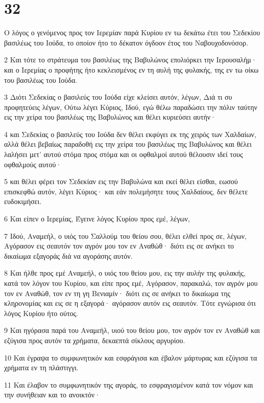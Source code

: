 \chapter{32}

\par Ο λόγος ο γενόμενος προς τον Ιερεμίαν παρά Κυρίου εν τω δεκάτω έτει του Σεδεκίου βασιλέως του Ιούδα, το οποίον ήτο το δέκατον όγδοον έτος του Ναβουχοδονόσορ.
\par 2 Και τότε το στράτευμα του βασιλέως της Βαβυλώνος επολιόρκει την Ιερουσαλήμ· και ο Ιερεμίας ο προφήτης ήτο κεκλεισμένος εν τη αυλή της φυλακής, της εν τω οίκω του βασιλέως του Ιούδα.
\par 3 Διότι Σεδεκίας ο βασιλεύς του Ιούδα είχε κλείσει αυτόν, λέγων, Διά τι συ προφητεύεις λέγων, Ούτω λέγει Κύριος, Ιδού, εγώ θέλω παραδώσει την πόλιν ταύτην εις την χείρα του βασιλέως της Βαβυλώνος και θέλει κυριεύσει αυτήν·
\par 4 και Σεδεκίας ο βασιλεύς του Ιούδα δεν θέλει εκφύγει εκ της χειρός των Χαλδαίων, αλλά θέλει βεβαίως παραδοθή εις την χείρα του βασιλέως της Βαβυλώνος και θέλει λαλήσει μετ' αυτού στόμα προς στόμα και οι οφθαλμοί αυτού θέλουσιν ιδεί τους οφθαλμούς αυτού·
\par 5 και θέλει φέρει τον Σεδεκίαν εις την Βαβυλώνα και εκεί θέλει είσθαι, εωσού επισκεφθώ αυτόν, λέγει Κύριος· και εάν πολεμήσητε τους Χαλδαίους, δεν θέλετε ευδοκιμήσει.
\par 6 Και είπεν ο Ιερεμίας, Έγεινε λόγος Κυρίου προς εμέ, λέγων,
\par 7 Ιδού, Αναμεήλ, ο υιός του Σαλλούμ του θείου σου, θέλει ελθεί προς σε, λέγων, Αγόρασον εις σεαυτόν τον αγρόν μου τον εν Αναθώθ· διότι εις σε ανήκει το δικαίωμα εξαγοράς διά να αγοράσης αυτόν.
\par 8 Και ήλθε προς εμέ Αναμεήλ, ο υιός του θείου μου, εις την αυλήν της φυλακής, κατά τον λόγον του Κυρίου, και είπε προς εμέ, Αγόρασον, παρακαλώ, τον αγρόν μου τον εν Αναθώθ, τον εν τη γη Βενιαμίν· διότι εις σε ανήκει το δικαίωμα της κληρονομίας και εις σε η εξαγορά· αγόρασον αυτόν εις σεαυτόν. Τότε εγνώρισα ότι λόγος Κυρίου ήτο ούτος.
\par 9 Και ηγόρασα παρά του Αναμεήλ, υιού του θείου μου, τον αγρόν τον εν Αναθώθ και εζύγισα προς αυτόν τα χρήματα, δεκαεπτά σίκλους αργυρίου.
\par 10 Και έγραψα το συμφωνητικόν και εσφράγισα και έβαλον μάρτυρας και εζύγισα τα χρήματα εν τη πλάστιγγι.
\par 11 Και έλαβον το συμφωνητικόν της αγοράς, το εσφραγισμένον κατά τον νόμον και την συνήθειαν και το ανοικτόν·
